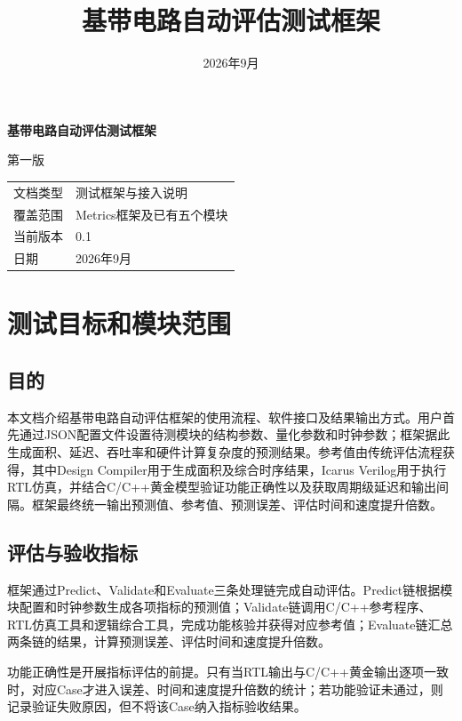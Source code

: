 \documentclass[a4paper,oneside,11pt]{ctexrep}
\title{基带电路自动评估测试框架}
\author{}
\date{2026年9月}
\begin{document}
\begin{titlepage}
    \centering
    \vspace*{3.0cm}
    {\Huge\bfseries 基带电路自动评估测试框架\par}
    \vspace{1.2cm}
    {\Large 第一版\par}
    \vspace{2.2cm}
    \begin{tabular}{ll}
        \toprule
        文档类型 & 测试框架与接入说明 \\
        覆盖范围 & Metrics框架及已有五个模块 \\
        当前版本 & 0.1 \\
        日期 & 2026年9月 \\
        \bottomrule
    \end{tabular}
    \vfill
\end{titlepage}

\tableofcontents
\thispagestyle{empty}
\clearpage
\setcounter{page}{1}

\chapter{测试目标和模块范围}

\section{目的}

本文档介绍基带电路自动评估框架的使用流程、软件接口及结果输出方式。用户首先通过JSON配置文件设置待测模块的结构参数、量化参数和时钟参数；框架据此生成面积、延迟、吞吐率和硬件计算复杂度的预测结果。参考值由传统评估流程获得，其中Design Compiler用于生成面积及综合时序结果，Icarus Verilog用于执行RTL仿真，并结合C/C++黄金模型验证功能正确性以及获取周期级延迟和输出间隔。框架最终统一输出预测值、参考值、预测误差、评估时间和速度提升倍数。

\section{评估与验收指标}

框架通过Predict、Validate和Evaluate三条处理链完成自动评估。Predict链根据模块配置和时钟参数生成各项指标的预测值；Validate链调用C/C++参考程序、RTL仿真工具和逻辑综合工具，完成功能核验并获得对应参考值；Evaluate链汇总两条链的结果，计算预测误差、评估时间和速度提升倍数。

功能正确性是开展指标评估的前提。只有当RTL输出与C/C++黄金输出逐项一致时，对应Case才进入误差、时间和速度提升倍数的统计；若功能验证未通过，则记录验证失败原因，但不将该Case纳入指标验收结果。
\end{document}
